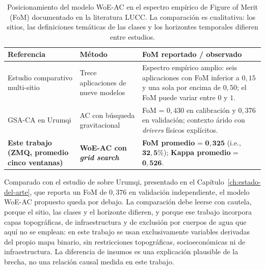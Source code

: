 \begin{table}[htbp]
\centering
\caption{Posicionamiento del modelo WoE-AC en el espectro empírico de Figure of Merit (FoM) documentado en la literatura LUCC. La comparación es cualitativa: los sitios, las definiciones temáticas de las clases y los horizontes temporales difieren entre estudios.}
\label{tab:literature_comparison}
\begin{tabularx}{\textwidth}{@{}>{\raggedright\arraybackslash}p{4.6cm} >{\raggedright\arraybackslash}p{2.8cm} X@{}}
\toprule
\textbf{Referencia} & \textbf{Método} & \textbf{FoM reportado / observado} \\
\midrule
Estudio comparativo multi-sitio \parencite{pontius2008comparing} & Trece aplicaciones de nueve modelos & Espectro empírico amplio: seis aplicaciones con FoM inferior a $0{,}15$ y una sola por encima de $0{,}50$; el FoM puede variar entre $0$ y $1$. \\
GSA-CA en Urumqi \parencite{Tang2024} & AC con búsqueda gravitacional & FoM = $0{,}430$ en calibración y $0{,}376$ en validación; contexto árido con \textit{drivers} físicos explícitos. \\
\textbf{Este trabajo (ZMQ, promedio cinco ventanas)} & \textbf{WoE-AC con \textit{grid search}} & \textbf{FoM promedio} = $\mathbf{0{,}325}$ (i.e., $\mathbf{32{,}5\%}$); \textbf{Kappa promedio} = $\mathbf{0{,}526}$. \\
\bottomrule
\end{tabularx}
\end{table}

Comparado con el estudio de \textcite{Tang2024} sobre Urumqi, presentado en el Capítulo~\ref{ch:estado-del-arte}, que reporta un FoM de $0{,}376$ en validación independiente, el modelo WoE-AC propuesto queda por debajo. La comparación debe leerse con cautela, porque el sitio, las clases y el horizonte difieren, y porque ese trabajo incorpora capas topográficas, de infraestructura y de exclusión por cuerpos de agua que aquí no se emplean: en este trabajo se usan exclusivamente variables derivadas del propio mapa binario, sin restricciones topográficas, socioeconómicas ni de infraestructura. La diferencia de insumos es una explicación plausible de la brecha, no una relación causal medida en este trabajo.

